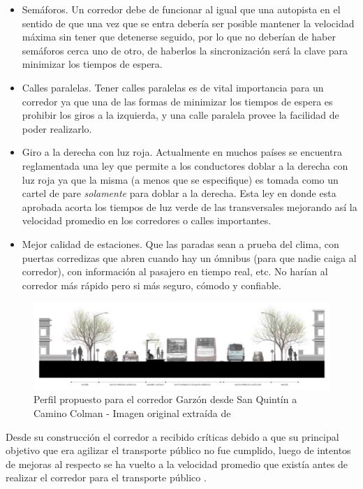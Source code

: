 \begin{itemize}
	\item Semáforos. Un corredor debe de funcionar al igual que una autopista en el sentido de que una vez que se entra debería ser posible mantener la velocidad máxima sin tener que detenerse seguido, por lo que no deberían de haber semáforos cerca uno de otro, de haberlos la sincronización será la clave para minimizar los tiempos de espera.
	\item Calles paralelas. Tener calles paralelas es de vital importancia para un corredor ya que una de las formas de minimizar los tiempos de espera es prohibir los giros a la izquierda, y una calle paralela provee la facilidad de poder realizarlo.
	\item Giro a la derecha con luz roja. Actualmente en muchos países se encuentra reglamentada una ley que permite a los conductores doblar a la derecha con luz roja ya que la misma (a menos que se especifique) es tomada como un cartel de pare \emph{solamente} para doblar a la derecha. Esta ley en donde esta aprobada acorta los tiempos de luz verde de las transversales mejorando así la velocidad promedio en los corredores o calles importantes.
	\item Mejor calidad de estaciones. Que las paradas sean a prueba del clima, con puertas corredizas que abren cuando hay un ómnibus (para que nadie caiga al corredor), con información al pasajero en tiempo real, etc. No harían al corredor más rápido pero si más seguro, cómodo y confiable.
\end{itemize}


\begin{figure}[H]
	\centering
	\includegraphics[width=0.9\linewidth]{Figures/busway_configuration}
	\caption{Perfil propuesto para el corredor Garzón desde San Quintín a Camino Colman - Imagen original extraída de \citep{PlanMovilidad}
	}
	\label{fig:perfil_garzon}
\end{figure}

Desde su construcción el corredor a recibido críticas debido a que su principal objetivo que era agilizar el transporte público no fue cumplido, luego de intentos de mejoras al respecto se ha vuelto a la velocidad promedio que existía antes de realizar el corredor para el transporte público \citep{olivera2015}.


